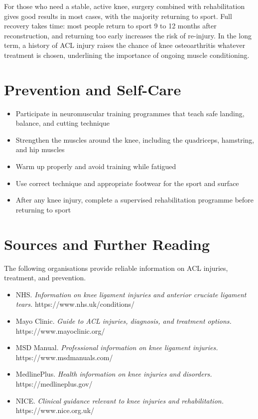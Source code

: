 For those who need a stable, active knee, surgery combined with rehabilitation gives good results in most cases, with the majority returning to sport. Full recovery takes time: most people return to sport 9 to 12 months after reconstruction, and returning too early increases the risk of re-injury. In the long term, a history of ACL injury raises the chance of knee osteoarthritis whatever treatment is chosen, underlining the importance of ongoing muscle conditioning.

\section*{Prevention and Self-Care}
\begin{itemize}
    \item Participate in neuromuscular training programmes that teach safe landing, balance, and cutting technique
    \item Strengthen the muscles around the knee, including the quadriceps, hamstring, and hip muscles
    \item Warm up properly and avoid training while fatigued
    \item Use correct technique and appropriate footwear for the sport and surface
    \item After any knee injury, complete a supervised rehabilitation programme before returning to sport
\end{itemize}

\section*{Sources and Further Reading}
The following organisations provide reliable information on ACL injuries, treatment, and prevention.

\begin{itemize}
    \item NHS. \textit{Information on knee ligament injuries and anterior cruciate ligament tears.} https://www.nhs.uk/conditions/
    \item Mayo Clinic. \textit{Guide to ACL injuries, diagnosis, and treatment options.} https://www.mayoclinic.org/
    \item MSD Manual. \textit{Professional information on knee ligament injuries.} https://www.msdmanuals.com/
    \item MedlinePlus. \textit{Health information on knee injuries and disorders.} https://medlineplus.gov/
    \item NICE. \textit{Clinical guidance relevant to knee injuries and rehabilitation.} https://www.nice.org.uk/
\end{itemize}
